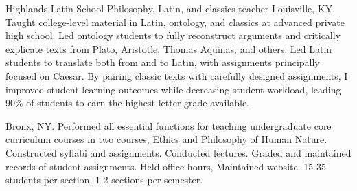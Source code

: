 {Highlands Latin School}
{Philosophy, Latin, and classics teacher}
{Louisville, KY. Taught college-level material in Latin, ontology, and classics at advanced private high school. 
	Led ontology students to fully reconstruct arguments 
	and critically explicate texts from Plato, Aristotle, Thomas Aquinas, and others. 
	Led Latin students to translate both from and to Latin, 
	with assignments principally focused on Caesar. 
	By pairing classic texts with carefully designed assignments, 
	I improved student learning outcomes 
	while decreasing student workload, 
	leading 90\% of students to earn the highest letter grade available.}

{Bronx, NY.  Performed all essential functions for teaching undergraduate core curriculum courses in two courses, \href{https://jacobarchambault.com/teaching-materials/philosophical-ethics-2/}{Ethics} and \href{https://jacobarchambault.com/teaching-materials/philosophy-of-human-nature/}{Philosophy of Human Nature}. Constructed syllabi and assignments. Conducted lectures. Graded and maintained records of student assignments. Held office hours, Maintained website. 15-35 students per section, 1-2 sections per semester. }